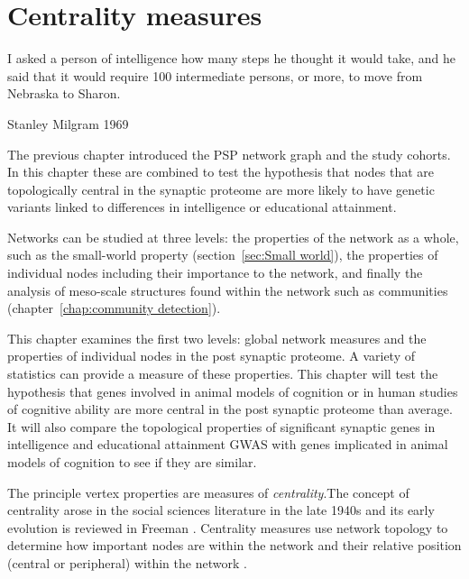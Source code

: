 \chapter{Centrality measures}
\label{chap:Centrality measures}



 \begin{displayquote}
 I asked a person of intelligence how many steps he thought it would take, and he said that it would require 100 intermediate persons, or more, to move from Nebraska to Sharon. \cite{milgram1967small}
 
 Stanley Milgram 1969
\end{displayquote}




The previous chapter introduced the PSP network graph and the study cohorts. In this chapter these are combined to test the hypothesis that nodes that are topologically central in the synaptic proteome are more likely to have genetic variants linked to differences in intelligence or educational attainment. 

 Networks can be studied at three levels: the properties of the network as a whole, such as the small-world property (section~\ref{sec:Small world}), the properties of individual nodes including their importance to the network, and finally the analysis of meso-scale structures found within the network such as communities (chapter~\ref{chap:community detection}).

This chapter examines the first two levels: global network measures and the properties of individual nodes in the post synaptic proteome.  A variety of statistics can provide a measure of these properties. This chapter will test the hypothesis that genes involved in animal models of cognition or in human studies of cognitive ability are more central in the post synaptic proteome than average. It will also compare the topological properties of significant synaptic genes in intelligence and educational attainment GWAS with genes implicated in animal models of cognition to see if they are similar. 

 The principle vertex properties are measures of \textit{centrality}.The concept of centrality arose in the social sciences literature in the late 1940s and its early evolution is reviewed in Freeman \cite{freeman1978centrality}. Centrality measures use network topology to determine how important nodes are within the network\cite{newman2018networks} and their relative position (central or peripheral) within the network \cite{freeman1978centrality}.

